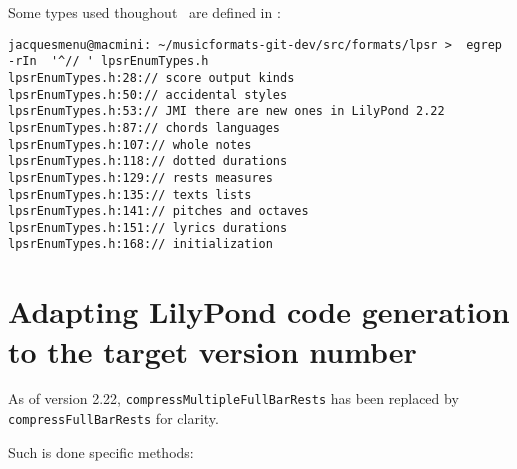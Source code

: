 Some types used thoughout \lpsrRepr\ are defined in :%
\begin{lstlisting}[language=Terminal]
jacquesmenu@macmini: ~/musicformats-git-dev/src/formats/lpsr >  egrep -rIn  '^// ' lpsrEnumTypes.h
lpsrEnumTypes.h:28:// score output kinds
lpsrEnumTypes.h:50:// accidental styles
lpsrEnumTypes.h:53:// JMI there are new ones in LilyPond 2.22
lpsrEnumTypes.h:87:// chords languages
lpsrEnumTypes.h:107:// whole notes
lpsrEnumTypes.h:118:// dotted durations
lpsrEnumTypes.h:129:// rests measures
lpsrEnumTypes.h:135:// texts lists
lpsrEnumTypes.h:141:// pitches and octaves
lpsrEnumTypes.h:151:// lyrics durations
lpsrEnumTypes.h:168:// initialization
\end{lstlisting}


\section{Adapting LilyPond code generation to the target version number}

As of version 2.22, {\tt compressMultipleFullBarRests} has been replaced by {\tt compressFullBarRests} for clarity.

Such is done specific methods:
\begin{lstlisting}[language=CPlusPlus]

\end{lstlisting}
